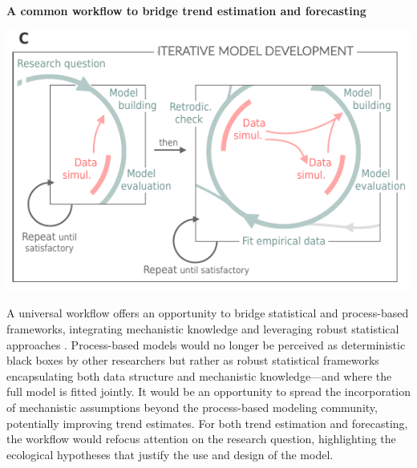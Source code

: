 \documentclass[11pt]{article}
\begin{document}
\begin{tcolorbox}
\centerline{\bf A common workflow to bridge trend estimation and forecasting} %
\vspace*{-3mm}
{\begin{multicols}{2}
\begin{minipage}[t]{\linewidth}
	\vfill
\includegraphics[width=\linewidth]{../figures/iterativeworkflow_details_revised}
\vfill
\vspace*{3mm}
\end{minipage}

\columnbreak
\vspace*{1mm}
A universal workflow offers an opportunity to bridge statistical and process-based frameworks, integrating mechanistic knowledge and leveraging robust statistical approaches \citep[e.g.][]{rounce2020quantifying}. Process-based models would no longer be perceived as deterministic black boxes by other researchers but rather as robust statistical frameworks encapsulating both data structure and mechanistic knowledge---and where the full model is fitted jointly. It would be an opportunity to spread the incorporation of mechanistic assumptions beyond the process-based modeling community, potentially improving trend estimates. For both trend estimation and forecasting, the workflow would refocus attention on the research question, highlighting the ecological hypotheses that justify the use and design of the model.

\end{multicols}}

\end{tcolorbox}
\end{document}
